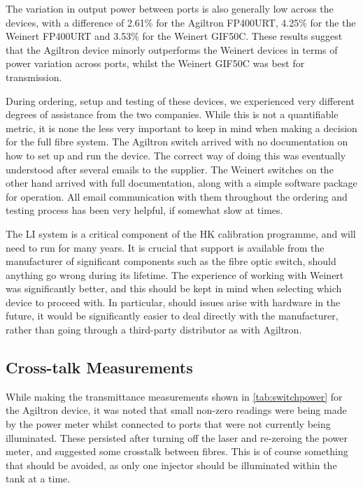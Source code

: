 \documentclass[a4paper,11pt]{article}
\begin{document}
The variation in output power between ports is also generally low across the devices, with a difference of 2.61\% for the Agiltron FP400URT, 4.25\% for the the Weinert FP400URT and 3.53\% for the Weinert GIF50C. These results suggest that the Agiltron device minorly outperforms the Weinert devices in terms of power variation across ports, whilst the Weinert GIF50C was best for transmission.

During ordering, setup and testing of these devices, we experienced very different degrees of assistance from the two companies. While this is not a quantifiable metric, it is none the less very important to keep in mind when making a decision for the full fibre system. The Agiltron switch arrived with no documentation on how to set up and run the device. The correct way of doing this was eventually understood after several emails to the supplier. The Weinert switches on the other hand arrived with full documentation, along with a simple software package for operation. All email communication with them throughout the ordering and testing process has been very helpful, if somewhat slow at times.

The LI system is a critical component of the HK calibration programme, and will need to run for many years. It is crucial that support is available from the manufacturer of significant components such as the fibre optic switch, should anything go wrong during its lifetime. The experience of working with Weinert was significantly better, and this should be kept in mind when selecting which device to proceed with. In particular, should issues arise with hardware in the future, it would be significantly easier to deal directly with the manufacturer, rather than going through a third-party distributor as with Agiltron.


\subsection{Cross-talk Measurements}

While making the transmittance measurements shown in \cref{tab:switchpower} for the Agiltron device, it was noted that small non-zero readings were being made by the power meter whilst connected to ports that were not currently being illuminated. These persisted after turning off the laser and re-zeroing the power meter, and suggested some crosstalk between fibres. This is of course something that should be avoided, as only one injector should be illuminated within the tank at a time.
\end{document}
